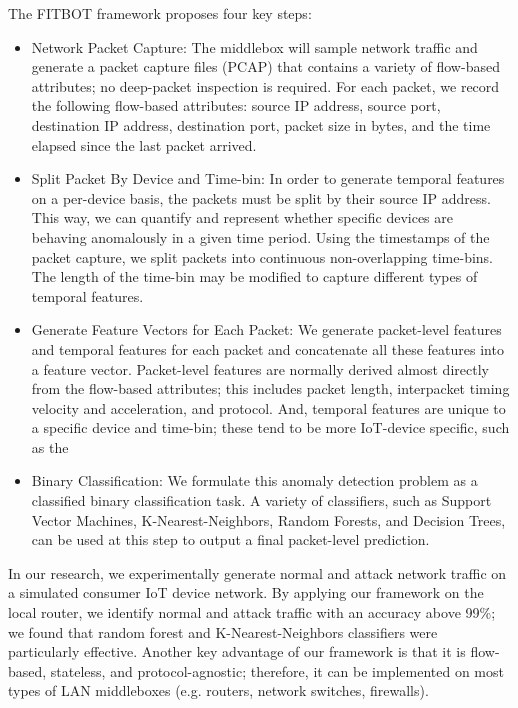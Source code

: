 The FITBOT framework proposes four key steps:
\begin{itemize}
	\item Network Packet Capture: The middlebox will sample network traffic and generate a packet capture files (PCAP) that contains a variety of flow-based attributes; no deep-packet inspection is required. For each packet, we record the following flow-based attributes: source IP address, source port, destination IP address, destination port, packet size in bytes, and the time elapsed since the last packet arrived. 

	\item Split Packet By Device and Time-bin: In order to generate temporal features on a per-device basis, the packets must be split by their source IP address. This way, we can quantify and represent whether specific devices are behaving anomalously in a given time period. Using the timestamps of the packet capture, we split packets into continuous non-overlapping time-bins. The length of the time-bin may be modified to capture different types of temporal features. 

	\item Generate Feature Vectors for Each Packet: We generate packet-level features and temporal features for each packet and concatenate all these features into a feature vector. Packet-level features are normally derived almost directly from the flow-based attributes; this includes packet length, interpacket timing velocity and acceleration, and protocol. And, temporal features are unique to a specific device and time-bin; these tend to be more IoT-device specific, such as the 

	\item Binary Classification: We formulate this anomaly detection problem as a classified binary classification task. A variety of classifiers, such as Support Vector Machines, K-Nearest-Neighbors, Random Forests, and Decision Trees, can be used at this step to output a final packet-level prediction.  
\end{itemize}
In our research, we experimentally generate normal and attack network traffic on a simulated consumer IoT device network. By applying our framework on the local router, we identify normal and attack traffic with an accuracy above 99\%; we found that random forest and K-Nearest-Neighbors classifiers were particularly effective. Another key advantage of our framework is that it is flow-based, stateless, and protocol-agnostic; therefore, it can be implemented on most types of LAN middleboxes (e.g. routers, network switches, firewalls).

